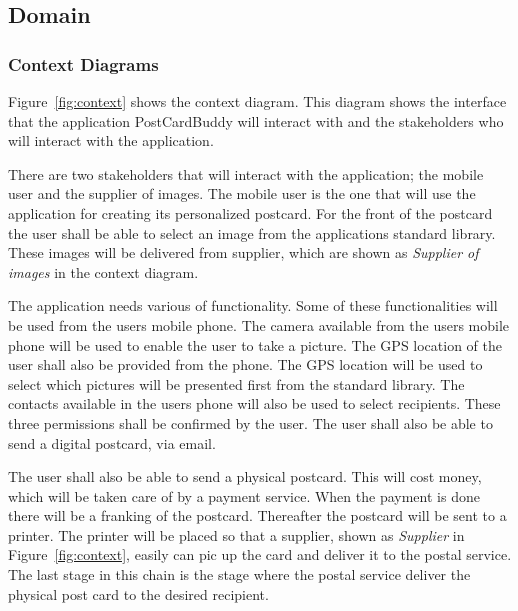 \documentclass[10pt,a4paper]{article}
\begin{document}
\subsection{Domain}

\subsubsection{Context Diagrams}
Figure~\ref{fig:context} shows the context diagram. This diagram shows the interface that the application PostCardBuddy will interact with and the stakeholders who will interact with the application.

There are two stakeholders that will interact with the application; the mobile user and the supplier of images. The mobile user is the one that will use the application for creating its personalized postcard. For the front of the postcard the user shall be able to select an image from the applications standard library. These images will be delivered from supplier, which are shown as \textit{Supplier of images} in the context diagram. 

The application needs various of functionality. Some of these functionalities will be used from the users mobile phone. The camera available from the users mobile phone will be used to enable the user to take a picture. The GPS location of the user shall also be provided from the phone. The GPS location will be used to select which pictures will be presented first from the standard library. The contacts available in the users phone will also be used to select recipients. These three permissions shall be confirmed by the user. The user shall also be able to send a digital postcard, via email. 

The user shall also be able to send a physical postcard. This will cost money, which will be taken care of by a payment service. When the payment is done there will be a franking of the postcard. Thereafter the postcard will be sent to a printer. The printer will be placed so that a supplier, shown as \textit{Supplier} in Figure~\ref{fig:context}, easily can pic up the card and deliver it to the postal service. The last stage in this chain is the stage where the postal service deliver the physical post card to the desired recipient. 
\end{document}
